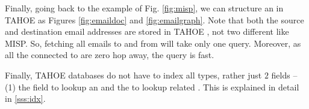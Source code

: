 Finally, going back to the example of Fig. \ref{fig:misp}, we can structure an  in TAHOE as Figures \ref{fig:emaildoc} and \ref{fig:emailgraph}. Note that both the source and destination email addresses are stored in TAHOE , not two different  like MISP. So, fetching all emails to and from  will take only one query. Moreover, as all the  connected to  are zero hop away, the query is fast.



Finally, TAHOE databases do not have to index all  types, rather just $2$ fields -- (1) the  field to lookup an  and the  to lookup related . This is explained in detail in \ref{sss:idx}.


\fi